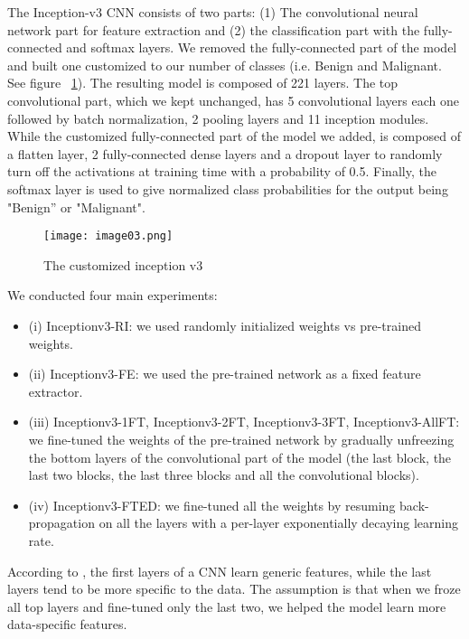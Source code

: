 \documentclass{article}
\begin{document}
The Inception-v3 CNN consists of two parts:
(1) The convolutional neural network part for feature extraction and (2) the classification part with the fully-connected and softmax layers. We removed the fully-connected part of the model and built one customized to our number of classes (i.e. Benign and Malignant. See figure ~\ref{fig:CNN}).
The resulting model is composed of 221 layers. The top convolutional part, which we kept unchanged, has 5 convolutional layers  each one followed by batch normalization, 2 pooling layers and 11 inception modules. While the customized fully-connected part of the model we added, is composed of a flatten layer, 2 fully-connected dense layers and a dropout layer to randomly turn off the activations at training time with a probability of 0.5. Finally, the softmax layer is used to give normalized class probabilities for the output being "Benign” or "Malignant".  
\begin{figure}[h]
  \centering
  \texttt{[image: image03.png]}
  \caption{The customized inception v3}
  \label{fig:CNN}
\end{figure}
We conducted four main experiments:
\begin{itemize}
\item (i) Inceptionv3-RI: we used randomly initialized weights vs pre-trained weights. 
\item (ii) Inceptionv3-FE: we used the pre-trained network as a fixed feature extractor.
\item (iii) Inceptionv3-1FT, Inceptionv3-2FT, Inceptionv3-3FT, Inceptionv3-AllFT: we fine-tuned the weights of the pre-trained network by gradually unfreezing the bottom layers of the convolutional part of the model (the last block, the last two blocks, the last three blocks and all the convolutional blocks).
\item (iv) Inceptionv3-FTED: we fine-tuned all the weights by resuming back-propagation on all the layers with a per-layer exponentially decaying learning rate.
\end{itemize}

According to \citep{yosinski2014transferable}, the first layers of a CNN learn generic features, while the last layers tend to be more specific to the data. The assumption is that when we froze all top layers and fine-tuned only the last two, we helped the model learn more data-specific features. 
\end{document}
